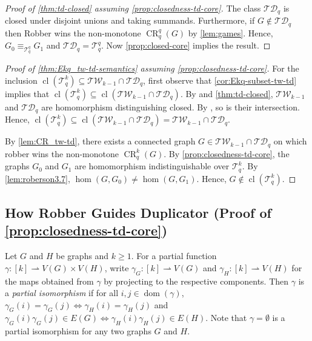 \documentclass[10pt,a4paper]{article}
\newcommand{\Ekq}{\ensuremath{\mathcal{T}_{q}^{k}}}
\DeclareMathOperator{\CR}{CR}
\DeclareMathOperator{\dom}{dom}
\DeclareMathOperator{\cl}{cl}
\begin{document}
\begin{proof}[Proof of \cref{thm:td-closed} assuming \cref{prop:closedness-td-core}]
	The class $\mathcal{TD}_q$ is closed under disjoint unions and taking summands.
	Furthermore, if $G \not\in \mathcal{TD}_q$ then Robber wins the non-monotone $\CR^q_q(G)$ by \cref{lem:games}. Hence, $G_0 \equiv_{\mathcal{T}_q^q} G_1$ and $\mathcal{TD}_q = \mathcal{T}_q^q$.
	Now \cref{prop:closed-core} implies the result.
\end{proof}

\begin{proof}[Proof of \cref{thm:Ekq_tw-td-semantics} assuming \cref{prop:closedness-td-core}]
	For the inclusion $\cl(\Ekq) \subseteq \mathcal{TW}_{k-1} \cap \mathcal{TD}_q$, first observe that \cref{cor:Ekq-subset-tw-td} implies that $\cl(\Ekq) \subseteq \cl(\mathcal{TW}_{k-1} \cap \mathcal{TD}_q)$.
	By \cite{neuen_homomorphism-distinguishing_2023} and \cref{thm:td-closed}, $\mathcal{TW}_{k-1}$ and $\mathcal{TD}_q$ are homomorphism distinguishing closed. By \cite[Lemma~6.1]{roberson_oddomorphisms_2022}, so is their intersection. Hence, $\cl(\Ekq) \subseteq \cl(\mathcal{TW}_{k-1} \cap \mathcal{TD}_q) = \mathcal{TW}_{k-1} \cap \mathcal{TD}_q$.
	
	By \cref{lem:CR_tw-td}, there exists a connected graph $G \in \mathcal{TW}_{k-1} \cap \mathcal{TD}_q$ on which robber wins the non-monotone $\CR^k_q(G)$. By \cref{prop:closedness-td-core}, the graphs $G_0$ and $G_1$ are homomorphism indistinguishable over $\Ekq$. By \cref{lem:roberson3.7}, $\hom(G, G_0) \neq \hom(G, G_1)$. Hence, $G \not\in \cl(\Ekq)$.
\end{proof}

\subsection{How Robber Guides Duplicator (Proof of \cref{prop:closedness-td-core})}


Let $G$ and $H$ be graphs and $k \geq 1$.
For a partial function $\gamma \colon [k] \rightharpoonup V(G) \times V(H)$, write $\gamma_G \colon [k] \rightharpoonup V(G)$ and $\gamma_H \colon [k] \rightharpoonup V(H)$ for the maps obtained from $\gamma$ by projecting to the respective components. Then $\gamma$ is a \emph{partial isomorphism} if for all $i, j \in \dom(\gamma)$, $\gamma_G(i) = \gamma_G(j) \Leftrightarrow \gamma_H(i) = \gamma_H(j)$ and $\gamma_G(i)\gamma_G(j) \in E(G) \Leftrightarrow \gamma_H(i)\gamma_H(j) \in E(H)$. Note that $\gamma = \emptyset$ is a partial isomorphism for any two graphs $G$ and $H$.
\end{document}
